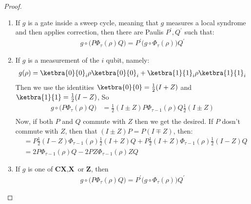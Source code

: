 \begin{proof}
  
  \begin{enumerate}
    \item If $g$ is a gate inside a sweep cycle, meaning that $g$ measures a local syndrome and then applies correction, then there are Paulis $P^{\prime}, Q^{\prime}$ such that:
      \begin{equation*}
        \begin{split}
          g \circ \bigl( P \Phi_{\tau}(\rho) Q \bigr) = P^{\prime} \bigl( g \circ \Phi_{\tau}(\rho) \bigr) Q^{\prime}
        \end{split}
      \end{equation*}
    \item If $g$ is a measurement of the $i$ qubit, namely:  
      \begin{equation*}
        \begin{split}
          g(\rho) = \ketbra{0}{0}_{i} \rho \ketbra{0}{0}_{i} + \ketbra{1}{1}_{i} \rho \ketbra{1}{1}_{i}
        \end{split}
      \end{equation*}
      Then we use the identities $\ketbra{0}{0} = \frac{1}{2}( I + Z )$ and $\ketbra{1}{1} = \frac{1}{2}( I - Z )$, So
      \begin{equation*}
        \begin{split}
          g \circ \bigl( P \Phi_{\tau}(\rho) Q \bigr)  &=  \frac{1}{2}( I \pm Z )P \Phi_{\tau-1}(\rho)  Q \frac{1}{2}( I \pm Z ) \\
        \end{split}
      \end{equation*}
      Now, if both $P$ and $Q$ commute with $Z$ then we get the desired. If $P$ dosn't commute with $Z$, then  that $(I \pm Z) P = P (I \mp Z)$, then:
      \begin{equation*}
        \begin{split}
           &=  P \frac{1}{2}( I - Z ) \Phi_{\tau-1}(\rho)  \frac{1}{2}( I + Z ) Q  + P \frac{1}{2}( I + Z ) \Phi_{\tau-1}(\rho)   \frac{1}{2}( I - Z ) Q    \\
         &=  2 P  \Phi_{\tau-1}(\rho) Q    - 2 P Z \Phi_{\tau-1}(\rho)  Z Q     
        \end{split}
      \end{equation*}

    \item If $g$ is one of $\textbf{CX}, \textbf{X}$ or $\textbf{Z}$, then 
      \begin{equation*}
        \begin{split}
          g \circ \bigl( P \Phi_{\tau}(\rho) Q \bigr) = P^{\prime} \bigl( g \circ \Phi_{\tau}(\rho) \bigr) Q^{\prime}
        \end{split}
      \end{equation*}
  \end{enumerate}
\end{proof}



